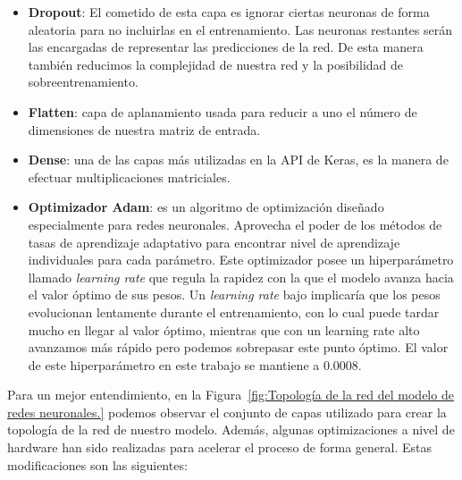 \begin{itemize}
    \item \textbf{Dropout}: El cometido de esta capa es ignorar ciertas neuronas de forma aleatoria para no incluirlas en el entrenamiento. Las neuronas restantes serán las encargadas de representar las predicciones de la red.
    De esta manera también reducimos la complejidad de nuestra red y la posibilidad de sobreentrenamiento.

    \item \textbf{Flatten}: capa de aplanamiento usada para reducir a uno el número de dimensiones de nuestra matriz de entrada.

    \item \textbf{Dense}: una de las capas más utilizadas en la API de Keras, es la manera de efectuar multiplicaciones matriciales.

    \item \textbf{Optimizador Adam}: es un algoritmo de optimización diseñado especialmente para redes neuronales. Aprovecha el poder de los métodos de tasas de aprendizaje adaptativo para encontrar nivel de aprendizaje individuales para cada parámetro.
    Este optimizador posee un hiperparámetro llamado \textit{learning rate} que regula la rapidez con la que el modelo avanza hacia el valor óptimo de sus pesos.
    Un \textit{learning rate} bajo implicaría que los pesos evolucionan lentamente durante el entrenamiento, con lo cual puede tardar mucho en llegar al valor óptimo, mientras que con un learning rate alto avanzamos más rápido pero podemos sobrepasar
    este punto óptimo. El valor de este hiperparámetro en este trabajo se mantiene a 0.0008.

\end{itemize}

Para un mejor entendimiento, en la Figura~\ref{fig:Topología de la red del modelo de redes neuronales.} podemos observar el conjunto de capas utilizado para crear la topología de la red de nuestro modelo. Además, algunas optimizaciones a nivel de hardware han sido realizadas para acelerar el proceso de forma general. Estas modificaciones son las siguientes:


